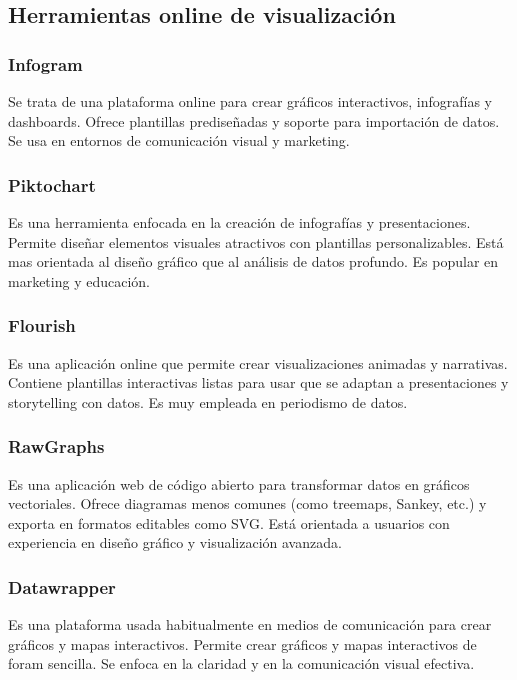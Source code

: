 \documentclass{../../miPlantilla}
\begin{document}
\newpage

\subsection{Herramientas online de visualización}

\subsubsection{Infogram}
Se trata de una plataforma online para crear gráficos interactivos, infografías y dashboards. Ofrece plantillas prediseñadas y soporte
para importación de datos. Se usa en entornos de comunicación visual y marketing.

\subsubsection{Piktochart}
Es una herramienta enfocada en la creación de infografías y presentaciones. Permite diseñar elementos visuales atractivos con plantillas personalizables.
Está mas orientada al diseño gráfico que al análisis de datos profundo. Es popular en marketing y educación.

\subsubsection{Flourish}
Es una aplicación online que permite crear visualizaciones animadas y narrativas. Contiene plantillas interactivas listas para usar que
se adaptan a presentaciones y storytelling con datos. Es muy empleada en periodismo de datos.

\subsubsection{RawGraphs}
Es una aplicación web de código abierto para transformar datos en gráficos vectoriales. Ofrece diagramas menos comunes (como treemaps, Sankey, etc.)
y exporta en formatos editables como SVG. Está orientada a usuarios con experiencia en diseño gráfico y visualización avanzada.

\subsubsection{Datawrapper}
Es una plataforma usada habitualmente en medios de comunicación para crear gráficos y mapas interactivos. Permite crear gráficos y mapas
interactivos de foram sencilla. Se enfoca en la claridad y en la comunicación visual efectiva.
\end{document}
